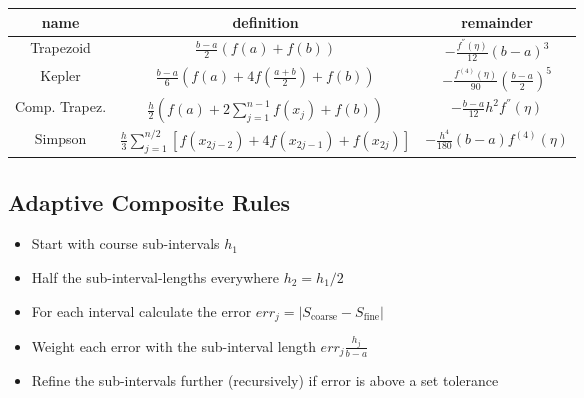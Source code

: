 \documentclass[
    a4paper,
    11pt
]{article}
\begin{document}
\begin{table}[H]
    \centering
    \begin{tabulary}{\linewidth}{C C C}
        \toprule
        name & definition & remainder\\
        \midrule
        Trapezoid &
            $\displaystyle \frac{b-a}{2} (f(a) + f(b)) $ &
            $\displaystyle -\frac{f^{''}(\eta)}{12}(b-a)^3$
        \\
        Kepler &
            $\displaystyle \frac{b-a}{6} \left( f(a) + 4f(\frac{a+b}{2}) + f(b)
            \right)$ &
            $\displaystyle - \frac{f^{(4)}(\eta)}{90} \left(\frac{b-a}{2}
            \right)^5$
        \\
        \midrule
        Comp. Trapez. &
            $\displaystyle \frac{h}{2} \left( f(a) + 2 \sum_{j=1}^{n-1}f(x_j) +
            f(b) \right) $ &
            $\displaystyle - \frac{b-a}{12} h^2 f^{''}(\eta)$
        \\
        Simpson &
            $\displaystyle \frac{h}{3} \sum_{j=1}^{n/2} \left[ f(x_{2j-2}) + 4
            f(x_{2j-1}) + f(x_{2j}) \right] $ &
            $\displaystyle - \frac{h^4}{180}(b-a) f^{(4)}(\eta)$
        \\

        \bottomrule

    \end{tabulary}
\end{table}

\subsection{Adaptive Composite Rules}

\begin{itemize}
    \item Start with course sub-intervals $h_1$
    \item Half the sub-interval-lengths everywhere $h_2=h_1/2$
    \item For each interval calculate the error $err_j = |S_{\text{coarse}} -
        S_{\text{fine}}|$
    \item Weight each error with the sub-interval length $err_j \frac{h_j}{b-a}$
    \item Refine the sub-intervals further (recursively) if error is above a set
        tolerance
\end{itemize}
\end{document}
